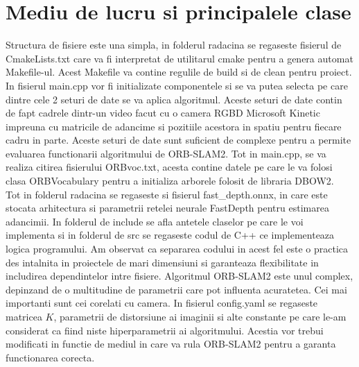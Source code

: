 \documentclass[12pt,a4paper]{report}
\begin{document}
\section{Mediu de lucru si principalele clase}
Structura de fisiere este una simpla, in folderul radacina se regaseste fisierul de 
CmakeLists.txt care va fi interpretat de utilitarul cmake pentru a genera automat Makefile-ul. 
Acest Makefile va contine regulile de build si de clean pentru proiect. In fisierul main.cpp
vor fi initializate componentele si se va putea selecta pe care dintre cele 2 seturi
de date se va aplica algoritmul. Aceste seturi de date contin de fapt cadrele dintr-un video 
facut cu o camera RGBD Microsoft Kinetic impreuna cu matricile de adancime si pozitiile acestora
in spatiu pentru fiecare cadru in parte. Aceste seturi de date sunt suficient de complexe pentru 
a permite evaluarea functionarii algoritmului de ORB-SLAM2. Tot in main.cpp, se va realiza citirea
fisierului ORBvoc.txt, acesta contine datele pe care le va folosi clasa ORBVocabulary pentru a
initializa arborele folosit de libraria DBOW2. \\
Tot in folderul radacina se regaseste si fisierul fast\_depth.onnx, in care este stocata 
arhitectura si parametrii retelei neurale FastDepth pentru estimarea adancimii. In folderul de 
include se afla antetele claselor pe care le voi implementa si in folderul de  src se regaseste 
codul de C++ ce implementeaza logica programului.
Am observat ca separarea codului in acest fel este o practica des intalnita in proiectele de mari
dimensiuni si garanteaza flexibilitate in includirea dependintelor intre fisiere. Algoritmul 
ORB-SLAM2 este unul complex, depinzand de o multitudine de parametrii care pot influenta acuratetea.
Cei mai importanti sunt cei corelati cu camera. In fisierul config.yaml se regaseste matricea \(K\), 
parametrii de distorsiune ai imaginii si alte constante pe care le-am considerat ca fiind niste
hiperparametrii ai algoritmului. Acestia vor trebui modificati in functie de mediul in care va 
rula ORB-SLAM2 pentru a garanta functionarea corecta. \\
\end{document}
